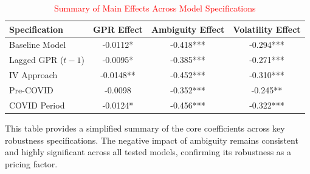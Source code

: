 \documentclass[preprint,12pt,authoryear]{elsarticle}
\begin{document}
\begin{table}[htbp]
\centering
\color{red}
\caption{\textcolor{red}{Summary of Main Effects Across Model Specifications}}
\label{tab:summary_effects}
\begin{threeparttable}
\begin{tabular*}{\textwidth}{@{\extracolsep{\fill}} lccc @{\extracolsep{\fill}}}
\toprule
Specification & GPR Effect & Ambiguity Effect & Volatility Effect \\
\midrule
Baseline Model & -0.0112* & -0.418*** & -0.294*** \\
Lagged GPR ($t-1$) & -0.0095* & -0.385*** & -0.271*** \\
IV Approach & -0.0148** & -0.452*** & -0.310*** \\
Pre-COVID & -0.0098 & -0.352*** & -0.245** \\
COVID Period & -0.0124* & -0.456*** & -0.322*** \\
\bottomrule
\end{tabular*}
\begin{tablenotes}[flushleft]
\small
\item[] This table provides a simplified summary of the core coefficients across key robustness specifications. The negative impact of ambiguity remains consistent and highly significant across all tested models, confirming its robustness as a pricing factor.
\end{tablenotes}
\end{threeparttable}
\end{table}
\end{document}
